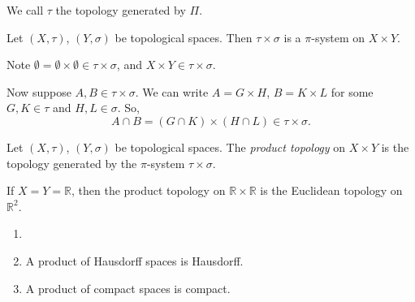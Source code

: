 \documentclass[12pt]{article}
\begin{document}
We call $\tau$ the topology generated by $\Pi$.

\begin{proposition}
	Let $(X, \tau)$, $(Y, \sigma)$ be topological spaces. Then $\tau \times \sigma$ is a $\pi$-system on $X \times Y$.
\end{proposition}

\begin{proofbox}
	Note $\emptyset = \emptyset \times \emptyset \in \tau \times \sigma$, and $X \times Y \in \tau \times \sigma$.

	Now suppose $A, B \in \tau \times \sigma$. We can write $A = G \times H$, $B = K \times L$ for some $G, K \in \tau$ and $H, L \in \sigma$. So,
	\[
		A \cap B = (G \cap K) \times(H \cap L) \in \tau \times \sigma
	.\]
\end{proofbox}

\begin{definition}
	Let $(X, \tau)$, $(Y, \sigma)$ be topological spaces. The \textit{product topology} on $X \times Y$ is the topology generated by the $\pi$-system $\tau \times \sigma$.
\end{definition}

\begin{exbox}
	If $X = Y = \mathbb{R}$, then the product topology on $\mathbb{R} \times \mathbb{R}$ is the Euclidean topology on $\mathbb{R}^2$.
\end{exbox}

\begin{theorem}
	\begin{enumerate}[\normalfont(i)]
		\item[]
		\item A product of Hausdorff spaces is Hausdorff.
		\item A product of compact spaces is compact.
	\end{enumerate}
\end{theorem}
\end{document}
